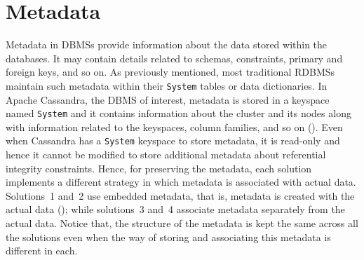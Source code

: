 \section{Metadata}\label{s:Metadata}
Metadata in \acp{DBMS} provide information about the data stored within the
databases.
It may contain details related to schemas, constraints,  primary and foreign keys, and
so on.   As previously mentioned,  most traditional \acp{RDBMS} maintain such
metadata within their \texttt{System}  tables or data dictionaries.  
In Apache Cassandra, the \ac{DBMS} of interest, metadata is stored in a 
keyspace named \texttt{System} and it contains information
about the cluster and its nodes along with information related to the
keyspaces, column families, and so on ().
 Even when Cassandra has a  \texttt{System} keyspace to store metadata, it 
 is read-only and hence it cannot be modified to store additional metadata
 about referential integrity constraints. 
Hence,  for preserving the metadata, each 
solution implements a  different strategy in which metadata is associated
with actual data. Solutions~1 and~2 use embedded metadata, that is, metadata
is created with the actual data (); while solutions~3 and~4
associate metadata separately from the actual data.  Notice that, the structure
 of the metadata is kept the same across all the solutions even when  the way of
 storing and associating this metadata is different in each. 

